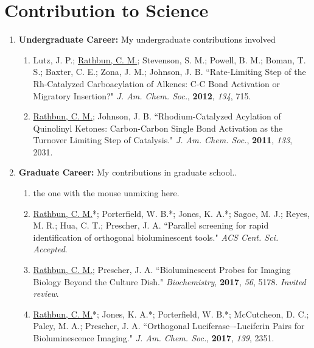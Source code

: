 \documentclass{nihbiosketch}
\begin{document}
\section{Contribution to Science}

\begin{enumerate}

\item \textbf{Undergraduate Career:} My undergraduate contributions involved %

\begin{enumerate}

  \item Lutz, J. P.; \underline{Rathbun, C. M.}; Stevenson, S. M.; Powell, B. M.; Boman, T. S.; Baxter, C. E.; Zona, J. M.; Johnson, J. B. ``Rate-Limiting Step of the Rh-Catalyzed Carboacylation of Alkenes: C-C Bond Activation or Migratory Insertion?" \textit{J. Am. Chem. Soc.}, \textbf{2012}, \textit{134}, 715.

  \item \underline{Rathbun, C. M.}; Johnson, J. B. ``Rhodium-Catalyzed Acylation of Quinolinyl Ketones: Carbon-Carbon Single Bond Activation as the Turnover Limiting Step of Catalysis." \textit{J. Am. Chem. Soc.}, \textbf{2011}, \textit{133}, 2031.

\end{enumerate}


\item \textbf{Graduate Career:} My contributions in graduate school.. %

\begin{enumerate}

  \item the one with the mouse unmixing here. %

  \item \underline{Rathbun, C. M.}*; Porterfield, W. B.*; Jones, K. A.*; Sagoe, M. J.; Reyes, M. R.; Hua, C. T.; Prescher, J. A. ``Parallel screening for rapid identification of orthogonal bioluminescent tools." \textit{ACS Cent. Sci. Accepted}. %

  \item \underline{Rathbun, C. M.}; Prescher, J. A. ``Bioluminescent Probes for Imaging Biology Beyond the Culture Dish." \textit{Biochemistry}, \textbf{2017}, \textit{56}, 5178. \textit{Invited review}.

  \item \underline{Rathbun, C. M.}*; Jones, K. A.*; Porterfield, W. B.*; McCutcheon, D. C.; Paley, M. A.; Prescher, J. A. ``Orthogonal Luciferase–-Luciferin Pairs for Bioluminescence Imaging." \textit{J. Am. Chem. Soc.}, \textbf{2017}, \textit{139}, 2351.


\end{enumerate}
\end{enumerate}
\end{document}
